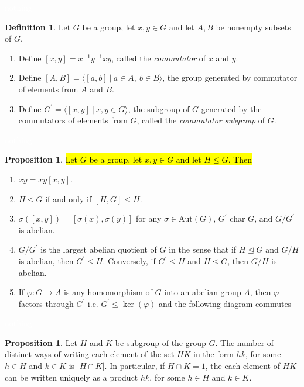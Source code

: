 \documentclass{article}
\theoremstyle{definition}
\newtheorem{prop}[thm]{Proposition}
\newtheorem{defn}[thm]{Definition}
\newcommand{\nl}{\textcolor{white}{nothing}}
\newcommand{\ra}{\rightarrow}
\newcommand{\p}{\prime}
\newcommand{\inv}{^{-1}}
\newcommand{\vphi}{\varphi}
\newcommand{\Aut}{\text{Aut}}
\begin{document}
\nl

\begin{defn}
Let $G$ be a group, let $x,y\in G$ and let $A,B$ be nonempty subsets of $G$.
\begin{enumerate}
\item Define $[x,y] = x\inv y\inv xy$, called the \textit{commutator} of $x$ and $y$.
\item Define $[A,B] = \langle [a,b]\ |\ a\in A,\ b\in B\rangle$, the group generated by commutator of elements from $A$ and $B$.
\item Define $G^\p = \langle [x,y]\ |\ x,y\in G\rangle$, the subgroup of $G$ generated by the commutators of elements from $G$, called the \textit{commutator subgroup} of $G$.
\end{enumerate}
\end{defn}

\nl

\begin{prop}
\hl{Let $G$ be a group, let $x,y\in G$ and let $H\leq G$. Then}
\begin{enumerate}
\item $xy = xy[x,y]$.
\item $H\unlhd G$ if and only if $[H,G]\leq H$.
\item $\sigma([x,y]) = [\sigma(x), \sigma(y)]$ for any $\sigma \in \Aut(G)$, $G^\p$ char $G$, and $G/G^\p$ is abelian.
\item $G/G^\p$ is the largest abelian quotient of $G$ in the sense that if $H\unlhd G$ and $G/H$ is abelian, then $G^\p\leq H$. Conversely, if $G^\p\leq H$ and $H\unlhd G$, then $G/H$ is abelian.
\item If $\vphi:G\ra A$ is any homomorphism of $G$ into an abelian group $A$, then $\vphi$ factors through $G^\p$ i.e. $G^\p\leq\ker(\vphi)$ and the following diagram commutes
\end{enumerate}
\begin{center}
\end{center}
\end{prop}

\nl

\begin{prop}
Let $H$ and $K$ be subgroup of the group $G$. The number of distinct ways of writing each element of the set $HK$ in the form $hk$, for some $h\in H$ and $k\in K$ is $|H\cap K|$. In particular, if $H\cap K = 1$, the each element of $HK$ can be written uniquely as a product $hk$, for some $h\in H$ and $k\in K$.
\end{prop}
\end{document}
